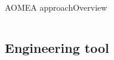 \begin{frame}{AOMEA approach}{Overview}
\begin{columns}
\begin{column}{0.5\textwidth}
        \end{column}

        \begin{column}{0.5\textwidth}
            \centering
        \end{column}

    \end{columns}

\end{frame}


\subsection{Engineering tool}

